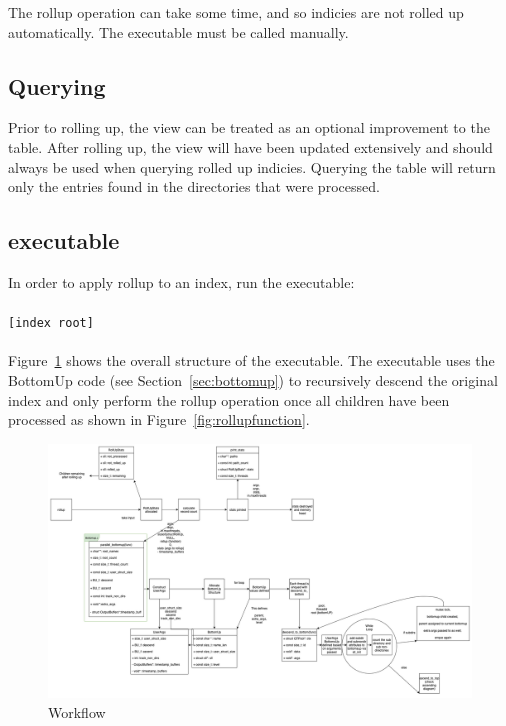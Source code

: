 The rollup operation can take some time, and so indicies are not
rolled up automatically. The \rollup executable must be called
manually.

\subsection{Querying}
Prior to rolling up, the \pentries view can be treated as an optional
improvement to the \entries table. After rolling up, the \pentries view
will have been updated extensively and should always be used when
querying rolled up indicies. Querying the \entries table will return
only the entries found in the directories that were processed.

\subsection{\rollup executable}
In order to apply rollup to an index, run the \rollup executable:
\\\\
\indent \rollup \texttt{[index root]}
\\\\
Figure~\ref{fig:rollupworkflow} shows the overall structure of the \rollup
executable. The \rollup executable uses the BottomUp code (see
Section~\ref{sec:bottomup}) to recursively descend the original index and only
perform the rollup operation once all children have been processed as
shown in Figure~\ref{fig:rollupfunction}.

\begin{figure} [!htb]
  \centering \includegraphics[width=\textwidth]{images/rollup.png}
  \caption{\rollup Workflow}
  \label{fig:rollupworkflow}
\end{figure}

